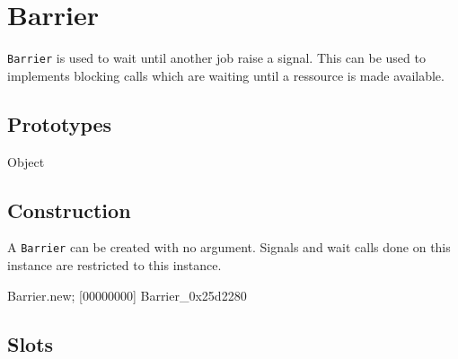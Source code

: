 \section{Barrier}

\lstinline|Barrier| is used to wait until another job raise a signal.  This
can be used to implements blocking calls which are waiting until a ressource
is made available.

\subsection{Prototypes}

\begin{refObjects}
\item[Object]
\end{refObjects}

\subsection{Construction}

A \lstinline|Barrier| can be created with no argument.  Signals and wait
calls done on this instance are restricted to this instance.

\begin{urbiscript}[firstnumber=1]
Barrier.new;
[00000000] Barrier_0x25d2280
\end{urbiscript}

\subsection{Slots}

